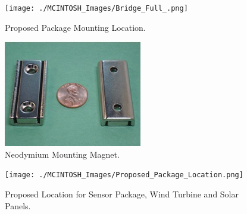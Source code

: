 \begin{figure}[h]
\centering
\texttt{[image: ./MCINTOSH\_Images/Bridge\_Full\_.png]}
\caption{Proposed Package Mounting Location.}
\label{fig:PackageLocation}
\end{figure}

\begin{figure}[h]
\centering
\includegraphics[width=\textwidth]{./MCINTOSH_Images/Neodymium_Mounting_Magnet.jpg}
\caption{Neodymium Mounting Magnet.}
\label{fig:Mounting Magnet}
\end{figure}

\begin{figure}[h]
\centering
\texttt{[image: ./MCINTOSH\_Images/Proposed\_Package\_Location.png]}
\caption{Proposed Location for Sensor Package, Wind Turbine and Solar Panels.}
\label{fig:Proposed Package, Panels and Turbine Location}
\end{figure}

